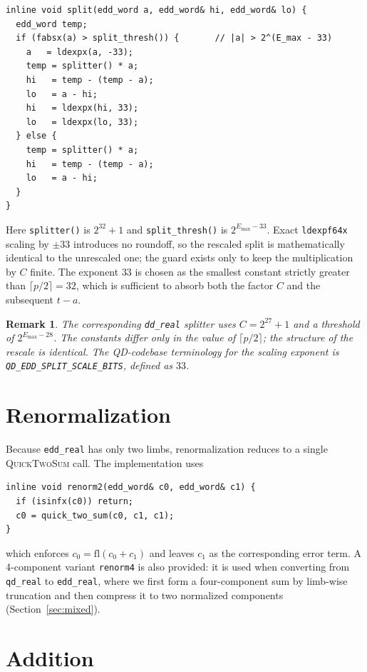 \documentclass[11pt,a4paper]{article}
\newtheorem{remark}{Remark}
\begin{document}
\begin{lstlisting}
inline void split(edd_word a, edd_word& hi, edd_word& lo) {
  edd_word temp;
  if (fabsx(a) > split_thresh()) {       // |a| > 2^(E_max - 33)
    a   = ldexpx(a, -33);
    temp = splitter() * a;
    hi   = temp - (temp - a);
    lo   = a - hi;
    hi   = ldexpx(hi, 33);
    lo   = ldexpx(lo, 33);
  } else {
    temp = splitter() * a;
    hi   = temp - (temp - a);
    lo   = a - hi;
  }
}
\end{lstlisting}
Here \texttt{splitter()} is $2^{32} + 1$ and
\texttt{split\_thresh()} is $2^{E_{\max} - 33}$.  Exact
\texttt{ldexpf64x} scaling by $\pm 33$ introduces no roundoff,
so the rescaled split is mathematically identical to the
unrescaled one; the guard exists only to keep the multiplication
by $C$ finite.  The exponent $33$ is chosen as the smallest
constant strictly greater than $\lceil p/2 \rceil = 32$, which is
sufficient to absorb both the factor $C$ and the subsequent
$t - a$.

\begin{remark}
The corresponding \texttt{dd\_real} splitter uses $C = 2^{27}+1$
and a threshold of $2^{E_{\max}-28}$.  The constants differ only
in the value of $\lceil p/2 \rceil$; the structure of the rescale
is identical.  The QD-codebase terminology for the scaling
exponent is \texttt{QD\_EDD\_SPLIT\_SCALE\_BITS}, defined as
$33$.
\end{remark}

\section{Renormalization}
\label{sec:renorm}

Because \texttt{edd\_real} has only two limbs, renormalization
reduces to a single \textsc{QuickTwoSum} call.  The
implementation uses
\begin{lstlisting}
inline void renorm2(edd_word& c0, edd_word& c1) {
  if (isinfx(c0)) return;
  c0 = quick_two_sum(c0, c1, c1);
}
\end{lstlisting}
which enforces $c_0 = \mathrm{fl}(c_0 + c_1)$ and leaves $c_1$ as
the corresponding error term.  A 4-component variant
\texttt{renorm4} is also provided: it is used when converting
from \texttt{qd\_real} to \texttt{edd\_real}, where we first form
a four-component sum by limb-wise truncation and then compress it
to two normalized components (Section~\ref{sec:mixed}).

\section{Addition}
\label{sec:add}
\end{document}
